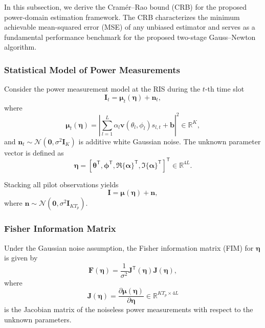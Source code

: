 \documentclass[journal]{IEEEtran}
\begin{document}
In this subsection, we derive the Cram\'er--Rao bound (CRB) for the proposed
power-domain estimation framework.
The CRB characterizes the minimum achievable mean-squared error (MSE) of any
unbiased estimator and serves as a fundamental performance benchmark for the
proposed two-stage Gauss--Newton algorithm.

\subsubsection{Statistical Model of Power Measurements}

Consider the power measurement model at the RIS during the $t$-th time slot
\begin{equation}
\mathbf{I}_t
=
\boldsymbol{\mu}_t(\boldsymbol{\eta})
+
\mathbf{n}_t,
\label{eq:crb_model}
\end{equation}
where
\begin{equation}
\boldsymbol{\mu}_t(\boldsymbol{\eta})
=
\left|
\sum_{l=1}^{L}
\alpha_l
\mathbf{v}(\theta_l,\phi_l)
s_{l,t}
+
\mathbf{b}
\right|^2
\in \mathbb{R}^{K},
\end{equation}
and $\mathbf{n}_t \sim \mathcal{N}(\mathbf{0},\sigma^2 \mathbf{I}_K)$ is
additive white Gaussian noise.
The unknown parameter vector is defined as
\begin{equation}
\boldsymbol{\eta}
=
\left[
\boldsymbol{\theta}^{\mathsf{T}},
\boldsymbol{\phi}^{\mathsf{T}},
\Re\{\boldsymbol{\alpha}\}^{\mathsf{T}},
\Im\{\boldsymbol{\alpha}\}^{\mathsf{T}}
\right]^{\mathsf{T}}
\in \mathbb{R}^{4L}.
\end{equation}

Stacking all pilot observations yields
\begin{equation}
\mathbf{I}
=
\boldsymbol{\mu}(\boldsymbol{\eta})
+
\mathbf{n},
\end{equation}
where
$\mathbf{n} \sim \mathcal{N}(\mathbf{0},\sigma^2 \mathbf{I}_{KT_p})$.

\subsubsection{Fisher Information Matrix}

Under the Gaussian noise assumption, the Fisher information matrix (FIM) for
$\boldsymbol{\eta}$ is given by
\begin{equation}
\mathbf{F}(\boldsymbol{\eta})
=
\frac{1}{\sigma^2}
\mathbf{J}^{\mathsf{T}}(\boldsymbol{\eta})
\mathbf{J}(\boldsymbol{\eta}),
\label{eq:fim_general}
\end{equation}
where
\begin{equation}
\mathbf{J}(\boldsymbol{\eta})
=
\frac{\partial \boldsymbol{\mu}(\boldsymbol{\eta})}
{\partial \boldsymbol{\eta}}
\in \mathbb{R}^{KT_p \times 4L}
\end{equation}
is the Jacobian matrix of the noiseless power measurements with respect to the
unknown parameters.
\end{document}
